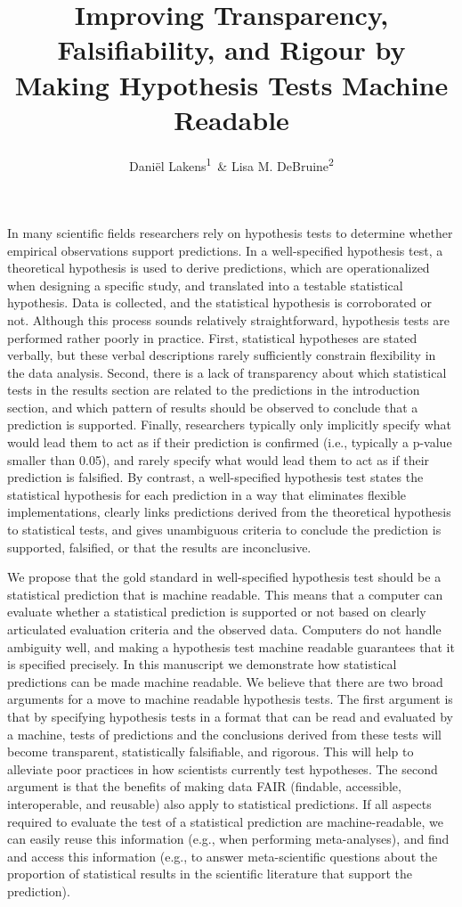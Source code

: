 \documentclass[doc,floatsintext]{apa6}
\title{Improving Transparency, Falsifiability, and Rigour by Making Hypothesis Tests Machine Readable}
\author{Daniël Lakens\textsuperscript{1}~\& Lisa M. DeBruine\textsuperscript{2}}
\date{}
\affiliation{
\vspace{0.5cm}
\textsuperscript{1} School of Innovation Sciences, Eindhoven University of Technology\\\textsuperscript{2} Institute of Neuroscience and Psychology, University of Glasgow}
\begin{document}
\maketitle

In many scientific fields researchers rely on hypothesis tests to determine whether empirical observations support predictions. In a well-specified hypothesis test, a theoretical hypothesis is used to derive predictions, which are operationalized when designing a specific study, and translated into a testable statistical hypothesis. Data is collected, and the statistical hypothesis is corroborated or not. Although this process sounds relatively straightforward, hypothesis tests are performed rather poorly in practice. First, statistical hypotheses are stated verbally, but these verbal descriptions rarely sufficiently constrain flexibility in the data analysis. Second, there is a lack of transparency about which statistical tests in the results section are related to the predictions in the introduction section, and which pattern of results should be observed to conclude that a prediction is supported. Finally, researchers typically only implicitly specify what would lead them to act as if their prediction is confirmed (i.e., typically a p-value smaller than 0.05), and rarely specify what would lead them to act as if their prediction is falsified. By contrast, a well-specified hypothesis test states the statistical hypothesis for each prediction in a way that eliminates flexible implementations, clearly links predictions derived from the theoretical hypothesis to statistical tests, and gives unambiguous criteria to conclude the prediction is supported, falsified, or that the results are inconclusive.

We propose that the gold standard in well-specified hypothesis test should be a statistical prediction that is machine readable. This means that a computer can evaluate whether a statistical prediction is supported or not based on clearly articulated evaluation criteria and the observed data. Computers do not handle ambiguity well, and making a hypothesis test machine readable guarantees that it is specified precisely. In this manuscript we demonstrate how statistical predictions can be made machine readable. We believe that there are two broad arguments for a move to machine readable hypothesis tests. The first argument is that by specifying hypothesis tests in a format that can be read and evaluated by a machine, tests of predictions and the conclusions derived from these tests will become transparent, statistically falsifiable, and rigorous. This will help to alleviate poor practices in how scientists currently test hypotheses. The second argument is that the benefits of making data FAIR (findable, accessible, interoperable, and reusable) also apply to statistical predictions. If all aspects required to evaluate the test of a statistical prediction are machine-readable, we can easily reuse this information (e.g., when performing meta-analyses), and find and access this information (e.g., to answer meta-scientific questions about the proportion of statistical results in the scientific literature that support the prediction).
\end{document}
